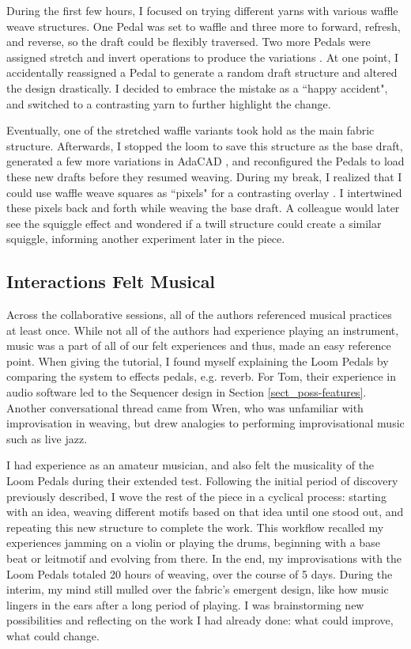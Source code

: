 During the first few hours, I focused on trying different yarns with various waffle weave structures. One Pedal was set to waffle and three more to forward, refresh, and reverse, so the draft could be flexibly traversed. Two more Pedals were assigned stretch and invert operations to produce the variations
. At one point, I accidentally reassigned a Pedal to generate a random draft structure and altered the design drastically. I decided to embrace the mistake as a ``happy accident", and switched to a contrasting yarn to further highlight the change. 

Eventually, one of the stretched waffle variants took hold as the main fabric structure. Afterwards, I stopped the loom to save this structure as the base draft, generated a few more variations in AdaCAD 
, and reconfigured the Pedals to load these new drafts before they resumed weaving. During my break, I realized that I could use waffle weave squares as ``pixels" for a contrasting overlay 
. I intertwined these pixels back and forth while weaving the base draft. A colleague would later see the squiggle effect and wondered if a twill structure could create a similar squiggle, informing another experiment later in the piece. 

\subsection{Interactions Felt Musical}

Across the collaborative sessions, all of the authors referenced musical practices at least once. While not all of the authors had experience playing an instrument, music was a part of all of our felt experiences and thus, made an easy reference point. When giving the tutorial, I found myself explaining the Loom Pedals by comparing the system to effects pedals, e.g. reverb. For Tom, their experience in audio software led to the Sequencer design in Section \ref{sect_poss-features}. Another conversational thread came from Wren, who was unfamiliar with improvisation in weaving, but drew analogies to performing improvisational music such as live jazz.

I had experience as an amateur musician, and also felt the musicality of the Loom Pedals during their extended test. Following the initial period of discovery previously described, I wove the rest of the piece in a cyclical process: starting with an idea, weaving different motifs based on that idea until one stood out, and repeating this new structure to complete the work. This workflow recalled my experiences jamming on a violin or playing the drums, beginning with a base beat or leitmotif and evolving from there. In the end, my improvisations with the Loom Pedals totaled 20 hours of weaving, over the course of 5 days. During the interim, my mind still mulled over the fabric's emergent design, like how music lingers in the ears after a long period of playing. I was brainstorming new possibilities and reflecting on the work I had already done: what could improve, what could change. 

